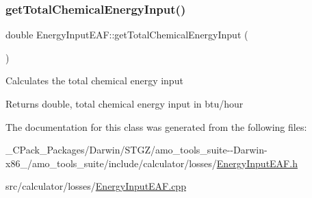 \subsubsection{\texorpdfstring{get\+Total\+Chemical\+Energy\+Input()}{getTotalChemicalEnergyInput()}\hspace{0.1cm}{\footnotesize\ttfamily [3/3]}}
{\footnotesize\ttfamily double Energy\+Input\+E\+A\+F\+::get\+Total\+Chemical\+Energy\+Input (\begin{DoxyParamCaption}{ }\end{DoxyParamCaption})}

Calculates the total chemical energy input

\begin{DoxyReturn}{Returns}
double, total chemical energy input in btu/hour 
\end{DoxyReturn}


The documentation for this class was generated from the following files\+:\begin{DoxyCompactItemize}
\item 
\+\_\+\+C\+Pack\+\_\+\+Packages/\+Darwin/\+S\+T\+G\+Z/amo\+\_\+tools\+\_\+suite-\/-\/\+Darwin-\/x86\+\_/amo\+\_\+tools\+\_\+suite/include/calculator/losses/\hyperlink{___c_pack___packages_2_darwin_2_s_t_g_z_2amo__tools__suite--_darwin-x86__64_2amo__tools__suite_25a35b9aa0eebdbaae0658026a04be93f}{Energy\+Input\+E\+A\+F.\+h}\item 
src/calculator/losses/\hyperlink{_energy_input_e_a_f_8cpp}{Energy\+Input\+E\+A\+F.\+cpp}\end{DoxyCompactItemize}
